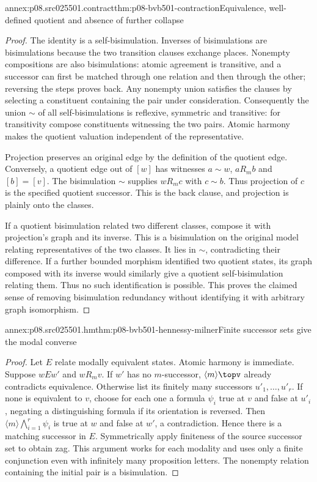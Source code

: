 \begin{annexitem}{annex:p08.src025501.contract}{thm:p08-bvb501-contraction}{Equivalence, well-defined quotient and absence of further collapse}
\begin{proof}
The identity is a self-bisimulation. Inverses of bisimulations are
bisimulations because the two transition clauses exchange places.
Nonempty compositions are also bisimulations: atomic agreement is transitive,
and a successor can first be matched through one relation and then through
the other; reversing the steps proves back. Any nonempty union satisfies
the clauses by selecting a constituent containing the pair under consideration.
Consequently the union \(\sim\) of all self-bisimulations is reflexive,
symmetric and transitive: for transitivity compose constituents witnessing
the two pairs. Atomic harmony makes the quotient valuation independent
of the representative.

Projection preserves an original edge by the definition of the quotient
edge. Conversely, a quotient edge out of \([w]\) has witnesses
\(a\sim w\), \(aR_mb\) and \([b]=[v]\).
The bisimulation \(\sim\) supplies \(wR_mc\) with \(c\sim b\).
Thus projection of \(c\) is the specified quotient successor. This is
the back clause, and projection is plainly onto the classes.

If a quotient bisimulation related two different classes, compose it with
projection's graph and its inverse. This is a bisimulation on the original
model relating representatives of the two classes. It lies in \(\sim\),
contradicting their difference. If a further bounded morphism identified
two quotient states, its graph composed with its inverse would similarly
give a quotient self-bisimulation relating them. Thus no such identification
is possible. This proves the claimed sense of removing bisimulation
redundancy without identifying it with arbitrary graph isomorphism.
\end{proof}
\end{annexitem}

\begin{annexitem}{annex:p08.src025501.hm}{thm:p08-bvb501-hennessy-milner}{Finite successor sets give the modal converse}
\begin{proof}
Let \(E\) relate modally equivalent states. Atomic harmony is immediate.
Suppose \(wEw'\) and \(wR_mv\). If \(w'\) has no \(m\)-successor,
\(\langle m\rangle\topv\) already contradicts equivalence. Otherwise
list its finitely many successors \(u'_1,\ldots,u'_r\).
If none is equivalent to \(v\), choose for each one a formula
\(\psi_i\) true at \(v\) and false at \(u'_i\), negating a
distinguishing formula if its orientation is reversed.
Then \(\langle m\rangle\bigwedge_{i=1}^r\psi_i\) is true at
\(w\) and false at \(w'\), a contradiction. Hence there is a matching
successor in \(E\). Symmetrically apply finiteness of the source
successor set to obtain zag. This argument works for each modality and
uses only a finite conjunction even with infinitely many proposition
letters. The nonempty relation containing the initial pair is a bisimulation.
\end{proof}
\end{annexitem}

